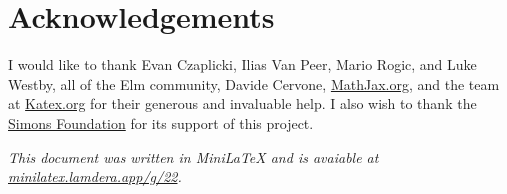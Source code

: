 \documentclass[11pt, oneside]{article}
\newcommand{\italic}[1]{{\sl #1}}
\begin{document}
 \section{Acknowledgements}
I  would  like  to  thank  Evan  Czaplicki,  Ilias  Van  Peer,  Mario  Rogic,  and  Luke  Westby,  all  of  the  Elm  community,  Davide  Cervone,   \href{https://mathjax.org}{MathJax.org},  and  the  team  at   \href{https://katex.org}{Katex.org} for  their  generous  and  invaluable  help.    I  also  wish  to  thank  the   \href{https://simonsfoundation.org}{Simons  Foundation} for  its  support  of  this  project.


 \italic{This  document  was  written  in  MiniLaTeX  and  is  avaiable  at   \href{https://minilatex.lamdera.app/g/22}{minilatex.lamdera.app/g/22}.}
\end{document}
